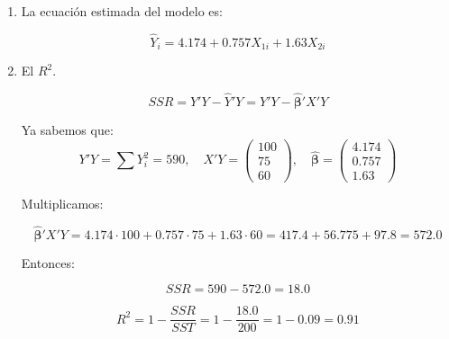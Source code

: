 \documentclass[10pt,a4paper]{article}
\begin{document}
{\begin{enumerate}
    \item[(4)] La ecuación estimada del modelo es:

\[
\hat{Y}_i = 4.174 + 0.757 X_{1i} + 1.63 X_{2i}
\]


\item[(5)]  El $R^2$.

\[
SSR = Y'Y - \hat{Y}'Y = Y'Y - \hat{\boldsymbol{\beta}}' X'Y
\]

Ya sabemos que:
\[
Y'Y = \sum Y_i^2 = 590, \quad X'Y = 
\begin{pmatrix}
100 \\
75 \\
60
\end{pmatrix}, \quad
\hat{\boldsymbol{\beta}} =
\begin{pmatrix}
4.174 \\
0.757 \\
1.63
\end{pmatrix}
\]

Multiplicamos:

\[
\hat{\boldsymbol{\beta}}' X'Y = 4.174 \cdot 100 + 0.757 \cdot 75 + 1.63 \cdot 60 = 417.4 + 56.775 + 97.8 = 572.0
\]

Entonces:

\[
SSR = 590 - 572.0 = 18.0
\]



\[
R^2 = 1 - \frac{SSR}{SST} = 1 - \frac{18.0}{200} = 1 - 0.09 = \boxed{0.91}
\]


\]
\end{enumerate}}
\end{document}
